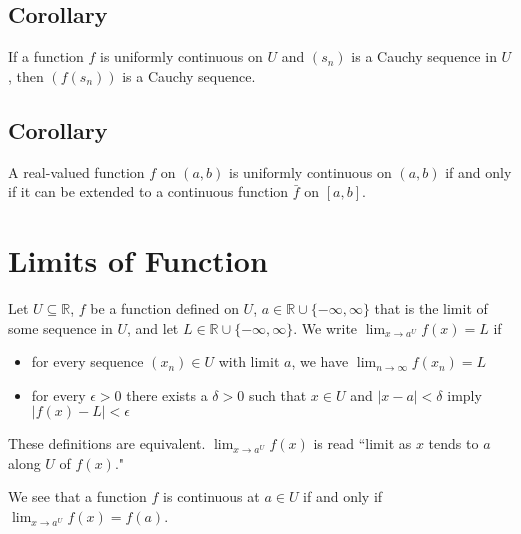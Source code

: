 \documentclass[12pt]{article}
\newcommand{\R}{\mathbb{R}}
\begin{document}
\subsection{Corollary} If a function $f$ is uniformly continuous on $U$ and $(s_n)$ is a Cauchy sequence in $U$, then $(f(s_n))$ is a Cauchy sequence.

\subsection{Corollary} A real-valued function $f$ on $(a,b)$ is uniformly continuous on $(a,b)$ if and only if it can be extended to a continuous function $\bar{f}$ on $[a,b]$.

\section{Limits of Function}

Let $U \subseteq \R$, $f$ be a function defined on $U$, $a \in \R \cup \{ -\infty, \infty \}$ that is the limit of some sequence in $U$, and let $L \in \R \cup \{ -\infty, \infty \}$. We write $\lim_{x \to a^U} f(x) = L$ if \begin{itemize}
\item for every sequence $(x_n) \in U$ with limit $a$, we have $\lim_{n \to \infty} f(x_n) = L$

\item for every $\epsilon > 0$ there exists a $\delta > 0$ such that $x \in U$ and $|x - a| < \delta$ imply $|f(x) - L| < \epsilon$
\end{itemize} These definitions are equivalent. $\lim_{x \to a^U} f(x)$ is read ``limit as $x$ tends to $a$ along $U$ of $f(x)$."

We see that a function $f$ is continuous at $a \in U$ if and only if $\lim_{x \to a^U} f(x) = f(a)$.
\end{document}
